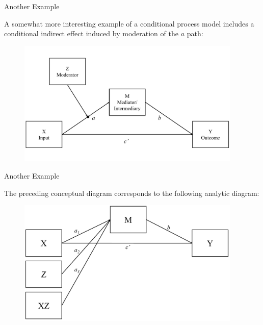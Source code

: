 \documentclass{beamer}
\newcommand{\vb}[0]{\vspace{6pt}}
\begin{document}
\begin{frame}{Another Example}
  
  A somewhat more interesting example of a conditional process model
  includes a conditional indirect effect induced by moderation of the
  $a$ path: 
  \vb
  \begin{figure}
    \includegraphics[width=0.95\textwidth]{figures/modAwithZConceptual.pdf}
  \end{figure}
  
\end{frame}



\begin{frame}{Another Example}
  
  The preceding conceptual diagram corresponds to the following
  analytic diagram: 
  \vb
  \begin{figure}
    \includegraphics[width=0.95\textwidth]{figures/modAwithZAnalytic.pdf}
  \end{figure}
  
\end{frame}
\end{document}
